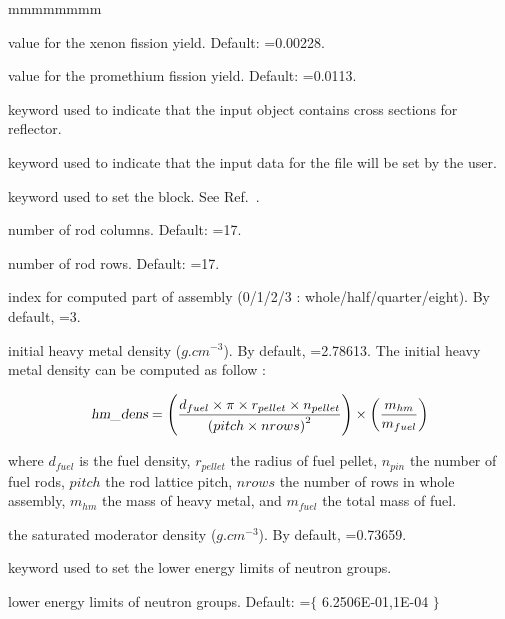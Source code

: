 \begin{ListeDeDescription}{mmmmmmmm}
\item[\dusa{yldxe}] value for the xenon fission yield. Default: =0.00228.

\item[\dusa{yldpm}] value for the promethium fission yield. Default: =0.0113.

\item[\moc{REFLECTOR}] keyword used to indicate that the input  object contains cross sections for reflector.

\item[\moc{HELIOS}] keyword used to indicate that the input data for the  file will be set by the user.

\item[\moc{FILE$\_$CONT$\_$1}]  keyword used to set the  block. See Ref.~.

\item[\dusa{ncols}] number of rod columns. Default: =17.

\item[\dusa{nrows}] number of rod rows. Default: =17.

\item[\dusa{part}] index for computed part of assembly (0/1/2/3 : whole/half/quarter/eight). By
default, =3.

\item[\dusa{hm$\_$dens}] initial heavy metal density ($g.cm^{-3}$). By
default, =2.78613. The initial heavy metal density can be computed as follow :

$$
\dusa{hm$\_$dens}=\left( d_{fuel}\times \pi \times r_{pellet} \times n_{pellet} \over \left( pitch \times nrows \right)^{2} \right) \times \left( m_{hm} \over m_{fuel }\right)
$$

where $d_{fuel}$ is the fuel density, $r_{pellet}$ the radius of fuel pellet, $n_{pin}$ the number of fuel rods, $pitch$ the rod lattice pitch, $nrows$ the number of rows in whole assembly,  $m_{hm}$ the mass of heavy metal, and $m_{fuel}$ the total mass of fuel.

\item[\dusa{bypass}] the saturated moderator density ($g.cm^{-3}$). By
default, =0.73659.

\item[\moc{FILE$\_$CONT$\_$2}]  keyword used to set the lower energy limits of neutron groups.

\item[\dusa{emin}] lower energy limits of neutron groups. Default: =$\lbrace$ 6.2506E-01,1E-04 $\rbrace$


\end{ListeDeDescription}
